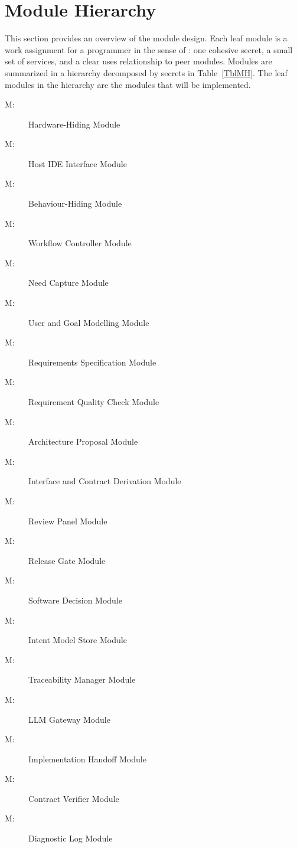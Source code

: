 \documentclass[12pt, titlepage]{article}
\newcounter{mnum}
\newcommand{\mthemnum}{M\themnum}
\begin{document}
\section{Module Hierarchy} \label{SecMH}

This section provides an overview of the module design. Each leaf module is a
work assignment for a programmer in the sense of \citet{ParnasEtAl1984}: one
cohesive secret, a small set of services, and a clear uses relationship to peer
modules. Modules are summarized in a hierarchy decomposed by secrets in
Table~\ref{TblMH}. The leaf modules in the hierarchy are the modules that will
be implemented.

\begin{description}
\item [ \mthemnum \label{mHH}:] Hardware-Hiding Module
\item [ \mthemnum \label{mHost}:] Host IDE Interface Module
\item [ \mthemnum \label{mBH}:] Behaviour-Hiding Module
\item [ \mthemnum \label{mControl}:] Workflow Controller Module
\item [ \mthemnum \label{mNeed}:] Need Capture Module
\item [ \mthemnum \label{mUsers}:] User and Goal Modelling Module
\item [ \mthemnum \label{mSpec}:] Requirements Specification Module
\item [ \mthemnum \label{mQuality}:] Requirement Quality Check Module
\item [ \mthemnum \label{mArch}:] Architecture Proposal Module
\item [ \mthemnum \label{mDerive}:] Interface and Contract Derivation Module
\item [ \mthemnum \label{mReview}:] Review Panel Module
\item [ \mthemnum \label{mGate}:] Release Gate Module
\item [ \mthemnum \label{mSD}:] Software Decision Module
\item [ \mthemnum \label{mStore}:] Intent Model Store Module
\item [ \mthemnum \label{mTrace}:] Traceability Manager Module
\item [ \mthemnum \label{mLLM}:] LLM Gateway Module
\item [ \mthemnum \label{mHandoff}:] Implementation Handoff Module
\item [ \mthemnum \label{mVerify}:] Contract Verifier Module
\item [ \mthemnum \label{mLog}:] Diagnostic Log Module
\end{description}
\end{document}
